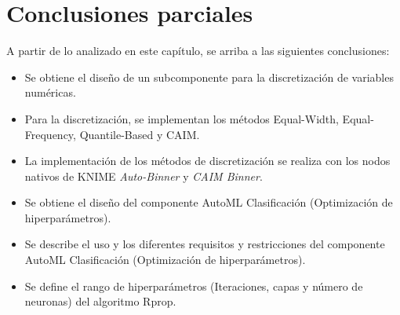 \section{Conclusiones parciales}
A partir de lo analizado en este capítulo, se arriba a las siguientes conclusiones:
\begin{itemize}
	\item Se obtiene el diseño de un subcomponente para la discretización de variables numéricas.
	\item Para la discretización, se implementan los métodos Equal-Width, Equal-Frequency, Quantile-Based y CAIM.
	\item La implementación de los métodos de discretización se realiza con los nodos nativos de KNIME \textit{Auto-Binner} y \textit{CAIM Binner}.
	\item Se obtiene el diseño del componente AutoML Clasificación (Optimización de hiperparámetros).
	\item Se describe el uso y  los diferentes requisitos y restricciones del componente AutoML Clasificación (Optimización de hiperparámetros).
	\item Se define el rango de hiperparámetros (Iteraciones, capas y número de neuronas) del algoritmo Rprop.
\end{itemize}

\pagebreak

